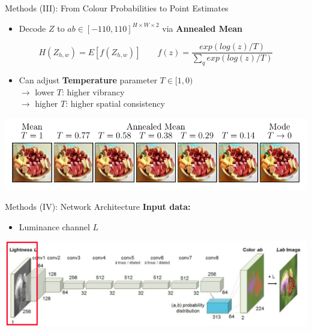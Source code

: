 \documentclass{beamer}
\begin{document}
\begin{frame}{Methods (III): From Colour Probabilities to Point Estimates}
  \begin{itemize}
    \item Decode $Z$ to $ab \in [-110,110]^{H \times W \times 2}$ via \textbf{Annealed Mean}
  \end{itemize}

  \begin{equation}
    H(Z_{h,w}) = E[f(Z_{h,w})] \qquad f(z) = \frac{exp(log(z)/T)}{\sum_q exp(log(z)/T)}
  \end{equation}

  \begin{itemize}
    \item Can adjust \textbf{Temperature} parameter $T \in [1, 0)$ \\
          $\rightarrow$ lower $T$: higher vibrancy \\
          $\rightarrow$ higher $T$: higher spatial consistency
  \end{itemize}

  \medskip

  \includegraphics[width=\linewidth]{resources/annealed_mean.pdf}
\end{frame}

\begin{frame}{Methods (IV): Network Architecture}
  \textbf{Input data:}
    \begin{itemize}
       \item Luminance channel $L$
    \end{itemize}

  \medskip

  \includegraphics[width=\linewidth]{resources/network1.jpg}
\end{frame}
\end{document}
